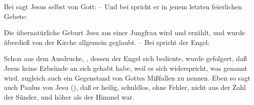 \begin{aufza}
\item Bei  sagt Jesus selbst von Gott:  -- Und bei  spricht er in jenem letzten feierlichen Gebete: 
\item Die übernatürliche Geburt Jesu aus einer Jungfrau wird  und  erzählt, und wurde überdieß von der Kirche allgemein geglaubt. -- Bei  spricht der Engel: 
\item Schon aus dem Ausdrucke, , dessen der Engel sich bediente, wurde gefolgert, daß Jesus keine Erbsünde an sich gehabt habe, weil es sich widerspricht, was  genannt wird, zugleich auch ein Gegenstand von Gottes Mißfallen zu nennen. Eben so sagt auch Paulus von Jesu (), daß er heilig, schuldlos, ohne Fehler, nicht aus der Zahl der Sünder, und höher als der Himmel war.

\end{aufza}
